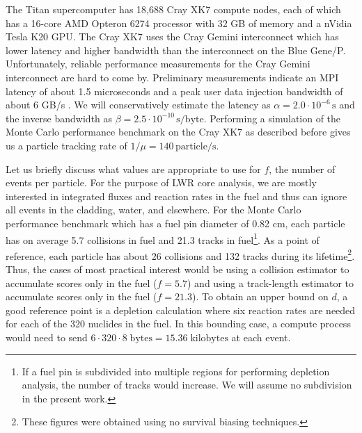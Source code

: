\documentclass[3p,fleqn]{elsarticle}
\newcommand{\unit}[1]{\ensuremath{\, \mathrm{#1}}}
\begin{document}
The Titan supercomputer has 18,688 Cray XK7 compute nodes, each of which has a
16-core AMD Opteron 6274 processor with 32 GB of memory and a nVidia Tesla K20
GPU. The Cray XK7 uses the Cray Gemini interconnect which has lower latency and
higher bandwidth than the interconnect on the Blue Gene/P. Unfortunately,
reliable performance measurements for the Cray Gemini interconnect are hard to
come by. Preliminary measurements indicate an MPI latency of about 1.5
microseconds and a peak user data injection bandwidth of about 6 GB/s
\cite{hlrs-workshop-2011}. We will conservatively estimate the latency as
$\alpha = 2.0 \cdot 10^{-6} \unit{s}$ and the inverse bandwidth as $\beta = 2.5
\cdot 10^{-10} \unit{s/byte}$. Performing a simulation of the Monte Carlo
performance benchmark on the Cray XK7 as described before gives us a particle
tracking rate of $1/\mu = 140 \unit{particle/s}$.

Let us briefly discuss what values are appropriate to use for $f$, the number of
events per particle. For the purpose of LWR core analysis, we are mostly
interested in integrated fluxes and reaction rates in the fuel and thus can
ignore all events in the cladding, water, and elsewhere. For the Monte Carlo
performance benchmark which has a fuel pin diameter of 0.82 cm, each particle
has on average 5.7 collisions in fuel and 21.3 tracks in fuel\footnote{If a fuel
  pin is subdivided into multiple regions for performing depletion analysis, the
  number of tracks would increase. We will assume no subdivision in the present
  work.}. As a point of reference, each particle has about 26 collisions and 132
tracks during its lifetime\footnote{These figures were obtained using no
  survival biasing techniques.}. Thus, the cases of most practical interest
would be using a collision estimator to accumulate scores only in the fuel ($f =
5.7$) and using a track-length estimator to accumulate scores only in the fuel
($f = 21.3$). To obtain an upper bound on $d$, a good reference point is a
depletion calculation where six reaction rates are needed for each of the 320
nuclides in the fuel. In this bounding case, a compute process would need to
send $6 \cdot 320 \cdot 8 \; \text{bytes} = 15.36 \; \text{kilobytes}$ at each
event.
\end{document}
